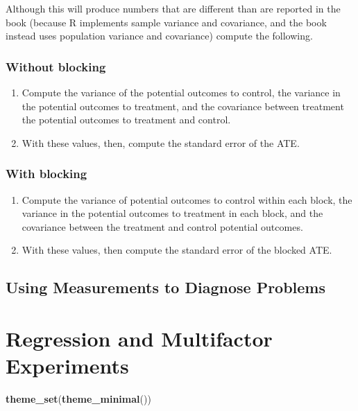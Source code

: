 \documentclass[
]{article}
\newenvironment{Shaded}{\begin{snugshade}}{\end{snugshade}}
\newcommand{\FunctionTok}[1]{\textcolor[rgb]{0.13,0.29,0.53}{\textbf{#1}}}
\newcommand{\NormalTok}[1]{#1}
\providecommand{\tightlist}{%
  \setlength{\itemsep}{0pt}\setlength{\parskip}{0pt}}
\theoremstyle{definition}
\theoremstyle{definition}
\theoremstyle{definition}
\theoremstyle{definition}
\theoremstyle{remark}
\begin{document}
Although this will produce numbers that are different than are reported in the book (because R implements sample variance and covariance, and the book instead uses population variance and covariance) compute the following.

\subsubsection{Without blocking}\label{without-blocking}

\begin{enumerate}
\def\labelenumi{\arabic{enumi}.}
\tightlist
\item
  Compute the variance of the potential outcomes to control, the variance in the potential outcomes to treatment, and the covariance between treatment the potential outcomes to treatment and control.
\item
  With these values, then, compute the standard error of the ATE.
\end{enumerate}

\subsubsection{With blocking}\label{with-blocking}

\begin{enumerate}
\def\labelenumi{\arabic{enumi}.}
\tightlist
\item
  Compute the variance of potential outcomes to control within each block, the variance in the potential outcomes to treatment in each block, and the covariance between the treatment and control potential outcomes.
\item
  With these values, then compute the standard error of the blocked ATE.
\end{enumerate}

\subsection{Using Measurements to Diagnose Problems}\label{using-measurements-to-diagnose-problems}

\section{Regression and Multifactor Experiments}\label{regression-and-multifactor-experiments}

\begin{Shaded}
\begin{Highlighting}[]
\FunctionTok{theme\_set}\NormalTok{(}\FunctionTok{theme\_minimal}\NormalTok{())}
\end{Highlighting}
\end{Shaded}
\end{document}
